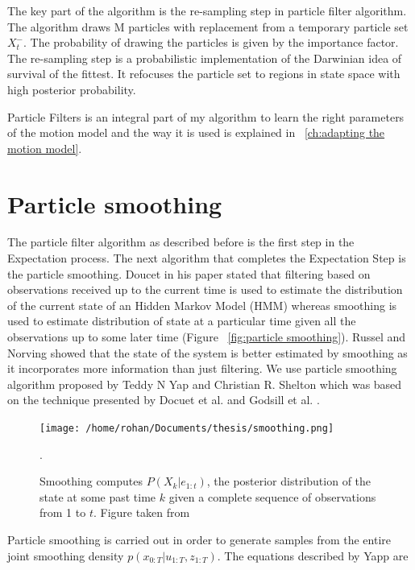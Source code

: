 \documentclass[12pt,draft]{dalcsthesis}
\begin{document}
The key part of the algorithm is the re-sampling step in particle filter algorithm. The algorithm draws M particles with replacement from a temporary particle set $X_{t}^{-}$. The probability of drawing the particles is given by the importance factor. The re-sampling step is a probabilistic implementation of the Darwinian idea of survival of the fittest. It refocuses the particle set to regions in state space with high posterior probability. 

Particle Filters is an integral part of my algorithm to learn the right parameters of the motion model and the way it is used is explained in ~\ref{ch:adapting the motion model}.

\section{Particle smoothing}
\label{ch-: particle smoothing}
The particle filter algorithm as described before is the first step in the Expectation process. The next algorithm that completes the Expectation Step is the particle smoothing. Doucet \cite{doucet2009tutorial} in his paper stated that filtering based on observations received up to the current time is used to estimate the distribution of the current state of an Hidden Markov Model (HMM) whereas smoothing is used to estimate distribution of state at a particular time given all the observations up to some later time (Figure ~\ref{fig:particle smoothing}). Russel and Norving \cite{russell2003artificial} showed that the state of the system is better estimated by smoothing as it incorporates more information than just filtering. We use particle smoothing algorithm proposed by Teddy N Yap and Christian R. Shelton \cite{Yap2008} which was based on the technique presented by Docuet et al. \cite{doucet2000monte} and Godsill et al. \cite{Godsill2004}.
\begin{figure}
\centering
{\texttt{[image: /home/rohan/Documents/thesis/smoothing.png]}}

\caption{\label{fig: particle smoothing} Smoothing computes $P(X_{k}|e_{1:t})$, the posterior distribution of the state at some past time $k$ given a complete sequence of observations from 1 to $t$. Figure taken from \cite{russell2003artificial}}.
\end{figure}

Particle smoothing is carried out in order to generate samples from the entire joint smoothing density $p(x_{0:T}|u_{1:T},z_{1:T})$. 
The equations described by Yapp \cite{Yap2008} are
\end{document}
